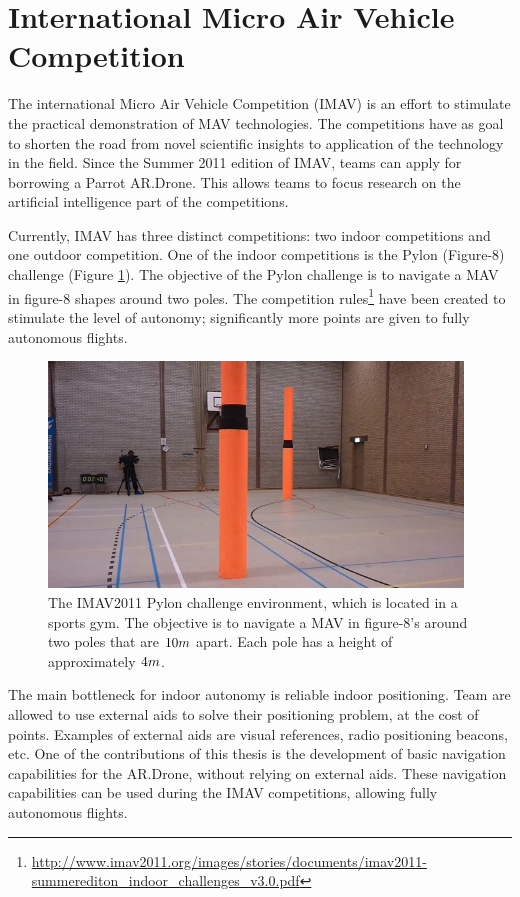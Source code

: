 	\section{International Micro Air Vehicle Competition}
\label{sec:introduction-imav}
The international Micro Air Vehicle Competition (IMAV) is an effort to stimulate the practical demonstration of MAV technologies.
The competitions have as goal to shorten the road from novel scientific insights to application of the technology in the field.
Since the Summer 2011 edition of IMAV, teams can apply for borrowing a Parrot AR.Drone.
This allows teams to focus research on the artificial intelligence part of the competitions.

Currently, IMAV has three distinct competitions: two indoor competitions and one outdoor competition.
One of the indoor competitions is the Pylon (Figure-8) challenge (Figure \ref{fig:imav2011_pylon}).
The objective of the Pylon challenge is to navigate a MAV in figure-8 shapes around two poles.
The competition rules\footnote{\url{http://www.imav2011.org/images/stories/documents/imav2011-summerediton_indoor_challenges_v3.0.pdf}} have been created to stimulate the level of autonomy; significantly more points are given to fully autonomous flights.

\begin{figure}[htb]
\centering
\includegraphics[width=11cm]{images/imav2011_pylon.jpg}
\caption{The IMAV2011 Pylon challenge environment, which is located in a sports gym.
The objective is to navigate a MAV in figure-8’s around two poles that are $10\small{m}$ apart. Each pole has a height of approximately $4\small{m}$.}
\label{fig:imav2011_pylon}
\end{figure}

The main bottleneck for indoor autonomy is reliable indoor positioning.
Team are allowed to use external aids to solve their positioning problem, at the cost of points.
Examples of external aids are visual references, radio positioning beacons, etc.
One of the contributions of this thesis is the development of basic navigation capabilities for the AR.Drone, without relying on external aids.
These navigation capabilities can be used during the IMAV competitions, allowing fully autonomous flights.

